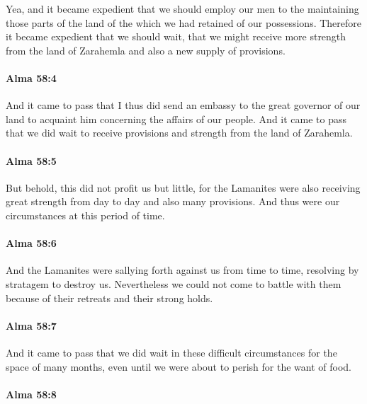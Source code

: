 			Yea, and it became expedient
			that we should employ our men to the maintaining those parts of the land
			of the which we had retained of our possessions.
			Therefore it became expedient that we should wait,
			that we might receive more strength from the land of Zarahemla
			and also a new supply of provisions.

		\paragraph{Alma 58:4} %
			\label{ALMA-58-4}

			And it came to pass that
			I thus did send an embassy to the great governor of our land
			to acquaint him concerning the affairs of our people.
			And it came to pass that we did wait
			to receive provisions and strength from the land of Zarahemla.

		\paragraph{Alma 58:5} %
			\label{ALMA-58-5}

			But behold, this did not profit us but little,
			for the Lamanites were also receiving great strength from day to day
			and also many provisions.
			And thus were our circumstances at this period of time.

		\paragraph{Alma 58:6} %
			\label{ALMA-58-6}

			And the Lamanites were sallying forth against us from time to time,
			resolving by stratagem to destroy us.
			Nevertheless we could not come to battle with them
			because of their retreats and their strong holds.

		\paragraph{Alma 58:7} %
			\label{ALMA-58-7}

			And it came to pass that we did wait in these difficult circumstances
			for the space of many months,
			even until we were about to perish for the want of food.

		\paragraph{Alma 58:8} %
			\label{ALMA-58-8}

